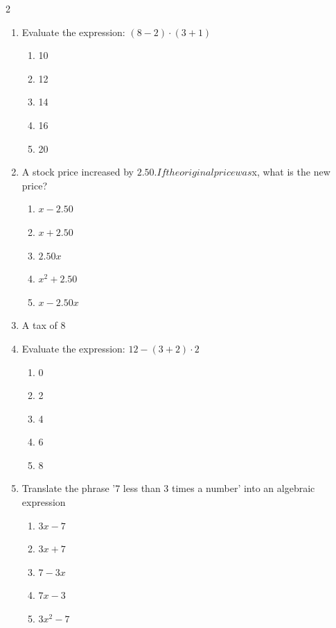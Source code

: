 \documentclass[10pt]{article}
\begin{document}
\begin{multicols}{2}
\begin{enumerate}[label=\textbf{Q\arabic*.}, leftmargin=*, itemsep=6pt, parsep=0pt]
  \item \small Evaluate the expression: $(8 - 2) \cdot (3 + 1)$
  \begin{enumerate}[label=(\Alph*), leftmargin=0.6cm, nosep, itemsep=2pt]
    \item 10
    \item 12
    \item 14
    \item 16
    \item 20
  \end{enumerate}

  \item \small A stock price increased by $2.50. If the original price was $x, what is the new price?
  \begin{enumerate}[label=(\Alph*), leftmargin=0.6cm, nosep, itemsep=2pt]
    \item $x - 2.50$
    \item $x + 2.50$
    \item $2.50x$
    \item $x^2 + 2.50$
    \item $x - 2.50x$
  \end{enumerate}

  \item \small A tax of 8%

  \item \small Evaluate the expression: $12 - (3 + 2) $
  \begin{enumerate}[label=(\Alph*), leftmargin=0.6cm, nosep, itemsep=2pt]
    \item 0
    \item 2
    \item 4
    \item 6
    \item 8
  \end{enumerate}

  \item \small Translate the phrase '7 less than 3 times a number' into an algebraic expression
  \begin{enumerate}[label=(\Alph*), leftmargin=0.6cm, nosep, itemsep=2pt]
    \item $3x - 7$
    \item $3x + 7$
    \item $7 - 3x$
    \item $7x - 3$
    \item $3x^2 - 7$
  \end{enumerate}

\end{enumerate}
\end{multicols}
\end{document}
